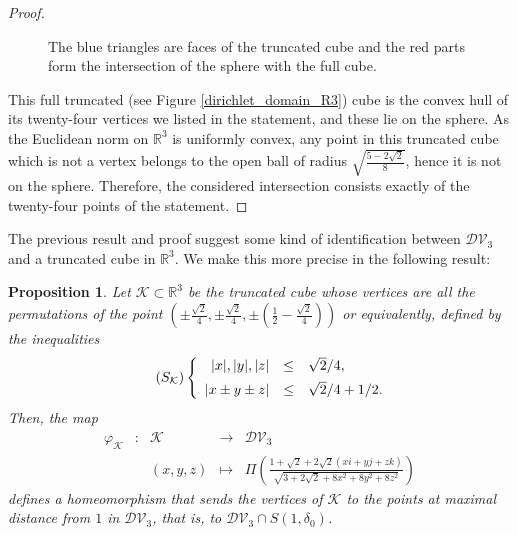 \documentclass[11pt,twoside]{amsart}
\theoremstyle{plain}
\newtheorem{prop}{Proposition}[section]
\newcommand{\R}{{\mathbb R}}
\newcommand{\longto}{\longrightarrow}
\begin{document}
\begin{proof}
\begin{center}
\begin{figure}[h!]
\caption{The blue triangles are faces of the truncated cube and the red parts form the intersection of the sphere with the full cube.}
\label{trunccube_red&blue}
\end{figure}
\end{center}

This full truncated (see Figure \ref{dirichlet_domain_R3}) cube is the convex hull of its twenty-four vertices we listed in the statement, and these lie on the sphere. As the Euclidean norm on $\R^3$ is uniformly convex, any point in this truncated cube which is not a vertex belongs to the open ball of radius $\sqrt{\tfrac{5-2\sqrt{2}}{8}}$, hence it is not on the sphere. Therefore, the considered intersection consists exactly of the twenty-four points of the statement.
\end{proof}

The previous result and proof suggest some kind of identification between $\mathcal{DV}_3$ and a truncated cube in $\R^3$. We make this more precise in the following result:
\begin{prop}\label{ident_tcube}
Let $\mathcal{K}\subset\R^3$ be the truncated cube whose vertices are all the permutations of the point $\left(\pm\tfrac{\sqrt{2}}{4},\pm\tfrac{\sqrt{2}}{4},\pm\left(\tfrac12-\tfrac{\sqrt{2}}{4}\right)\right)$ or equivalently, defined by the inequalities
\begin{equation}\label{eqK}\tag{$S_{\mathcal{K}}$}
\left\{\begin{array}{rcl}
|x|,|y|,|z| & \le & \sqrt{2}/4, \\[.5em]
|x\pm y\pm z| & \le & \sqrt{2}/4+1/2.\end{array}\right.
\end{equation}
Then, the map
\[\begin{array}{ccccc}
\varphi_{\mathcal{K}} & : & \mathcal{K} & \longto & \mathcal{DV}_3 \\ & & (x,y,z) & \longmapsto & \Pi\left(\frac{1+\sqrt{2}+2\sqrt{2}(xi+yj+zk)}{\sqrt{3+2\sqrt{2}+8x^2+8y^2+8z^2}}\right)\end{array}\]
defines a homeomorphism that sends the vertices of $\mathcal{K}$ to the points at maximal distance from $1$ in $\mathcal{DV}_3$, that is, to $\mathcal{DV}_3\cap S(1,\delta_0)$.
\end{prop}
\end{document}
